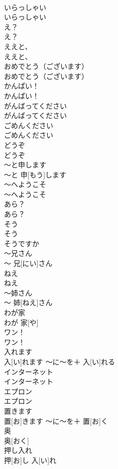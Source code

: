 \documentclass[8pt]{extreport}
\begin{document}
\begin{CJK}{UTF8}{min}
\\	いらっしゃい	
\\	いらっしゃい		
\\	え？	
\\	え？		
\\	ええと、	
\\	ええと、		
\\	おめでとう（ございます）	
\\	おめでとう（ございます）		
\\	かんぱい！	
\\	かんぱい！		
\\	がんばってください	
\\	がんばってください		
\\	ごめんください	
\\	ごめんください		
\\	どうぞ	
\\	どうぞ		
\\	〜と申します	
\\	〜と 申[もう]します		
\\	〜へようこそ	
\\	〜へようこそ		
\\	あら？	
\\	あら？		
\\	そう	
\\	そう	
\\	そうですか 
\\	〜兄さん	
\\	〜 兄[にい]さん		
\\	ねえ	
\\	ねえ		
\\	〜姉さん	
\\	〜 姉[ねえ]さん		
\\	わが家	
\\	わが 家[や]		
\\	ワン！	
\\	ワン！		
\\	入れます	
\\	入[い]れます	〜に〜を＋ 入[い]れる	
\\	インターネット	
\\	インターネット		
\\	エプロン	
\\	エプロン		
\\	置きます	
\\	置[お]きます	〜に〜を＋ 置[お]く	
\\	奥	
\\	奥[おく]		
\\	押し入れ	
\\	押[お]し 入[い]れ		

\end{CJK}
\end{document}
